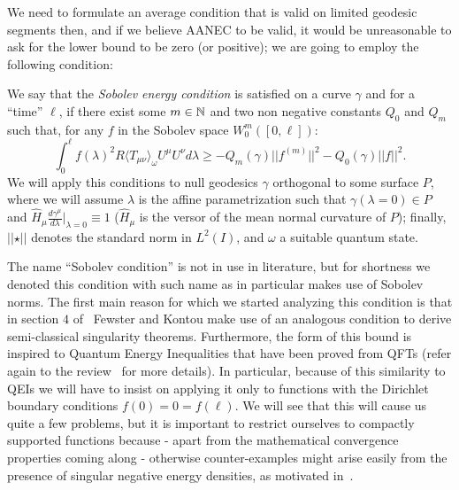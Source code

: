 We need to formulate an average condition that is valid on limited geodesic segments then, and if we believe AANEC to be valid, it would be unreasonable to ask for the lower bound to be zero (or positive); we are going to employ the following condition:

\begin{definition}
	We say that the \emph{Sobolev energy condition} is satisfied on a curve \(\gamma\) and for a ``time'' \(\ell\), if there exist some \(m\in {\mathbb{N}}\) and two non negative constants \(Q_0\) and \(Q_m\) such that, for any \(f\) in the Sobolev space \(W_0^m([0,\ell])\):
    \begin{equation}
        \label{eq:Sobolev-condition}
        \int_0^{\ell} f(\lambda)^2 R\langle T_{\mu\nu}\rangle_{\omega}U^{\mu}U^{\nu} d\lambda \ge -Q_m(\gamma) \vert\vert f^{(m)}\vert\vert^2 - Q_0(\gamma) \vert\vert f\vert\vert^2.
    \end{equation}
	\noindent
	We will apply this conditions to null geodesics \(\gamma\) orthogonal to some surface \(P\), where we will assume \(\lambda\) is the affine parametrization such that \(\gamma(\lambda = 0) \in P\) and \(\hat{H}_{\mu}\frac{d\gamma^{\mu}}{d\lambda}\Big\vert_{\lambda = 0} \equiv 1\) (\(\hat{H}_{\mu}\) is the versor of the mean normal curvature of \(P\)); finally, \(\vert\vert \star \vert\vert\) denotes the standard norm in \(L^2(I)\), and \(\omega\) a suitable quantum state.
\end{definition}

The name ``Sobolev condition'' is not in use in literature, but for shortness we denoted this condition with such name as in particular makes use of Sobolev norms.
The first main reason for which we started analyzing this condition is that in section \(4\) of~\cite{fewster2020new} Fewster and Kontou make use of an analogous condition to derive semi-classical singularity theorems.
Furthermore, the form of this bound is inspired to Quantum Energy Inequalities that have been proved from QFTs (refer again to the review~\cite[]{kontou2020energy} for more details). In particular, because of this similarity to QEIs we will have to insist on applying it only to functions with the Dirichlet boundary conditions \(f(0) = 0 = f(\ell) \). We will see that this will cause us quite a few problems, but it is important to restrict ourselves to compactly supported functions because - apart from the mathematical convergence properties coming along - otherwise counter-examples might arise easily from the presence of singular negative energy densities, as motivated in~\cite[]{ford1998quantum}.

